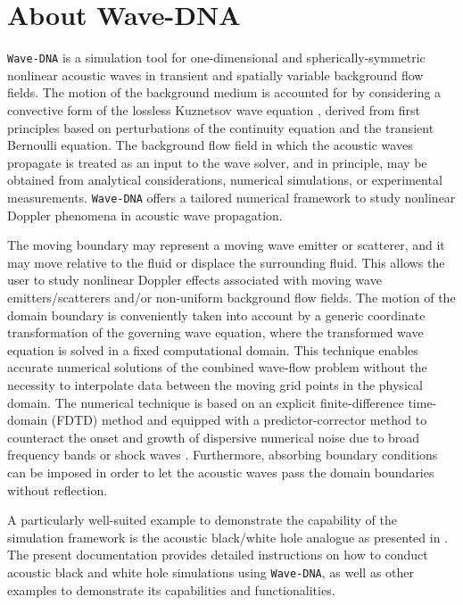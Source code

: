 \chapter{About Wave-DNA}
\label{chap:About Wave-DNA}

{\tt Wave-DNA} is a simulation tool for one-dimensional and spherically-symmetric nonlinear acoustic waves in transient and spatially variable background flow fields. The motion of the background medium is accounted for by considering a convective form of the lossless Kuznetsov wave equation \citep{Schenke_et_al_2023_JASA}, derived from first principles based on perturbations of the continuity equation and the transient Bernoulli equation. The background flow field in which the acoustic waves propagate is treated as an input to the wave solver, and in principle, may be obtained from analytical considerations, numerical simulations, or experimental measurements. {\tt Wave-DNA} offers a tailored numerical framework to study nonlinear Doppler phenomena in acoustic wave propagation.

The moving boundary may represent a moving wave emitter or scatterer, and it may move relative to the fluid or displace the surrounding fluid. This allows the user to study nonlinear Doppler effects associated with moving wave emitters/scatterers and/or non-uniform background flow fields. The motion of the domain boundary is conveniently taken into account by a generic coordinate transformation of the governing wave equation, where the transformed wave equation is solved in a fixed computational domain. 
This technique enables accurate numerical solutions of the combined wave-flow problem without the necessity to interpolate data between the moving grid points in the physical domain. The numerical technique is based on an explicit finite-difference time-domain (FDTD) method and equipped with a predictor-corrector method to counteract the onset and growth of dispersive numerical noise due to broad frequency bands or shock waves \citep{Schenke_et_al_2022}. Furthermore, absorbing boundary conditions can be imposed in order to let the acoustic waves pass the domain boundaries without reflection.

A particularly well-suited example to demonstrate the capability of the simulation framework is the acoustic black/white hole analogue as presented in \citep{Schenke_et_al_2022_PoF, Schenke_et_al_2023_JASA}. The present documentation provides detailed instructions on how to conduct acoustic black and white hole simulations using {\tt Wave-DNA}, as well as other examples to demonstrate its capabilities and functionalities.

